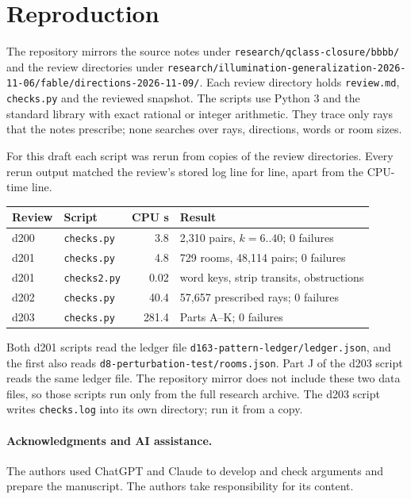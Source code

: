 \documentclass[11pt]{article}
\theoremstyle{definition}
\theoremstyle{remark}
\newcommand{\repopath}[1]{\nolinkurl{#1}}
\begin{document}
\section{Reproduction}\label{sec:repro}
The repository mirrors the source notes under
\repopath{research/qclass-closure/bbbb/} and the review directories under
\repopath{research/illumination-generalization-2026-11-06/fable/directions-2026-11-09/}.
Each review directory holds \texttt{review.md}, \texttt{checks.py} and the
reviewed snapshot. The scripts use Python 3 and the standard library with exact
rational or integer arithmetic. They trace only rays that the notes prescribe;
none searches over rays, directions, words or room sizes.

For this draft each script was rerun from copies of the review directories.
Every rerun output matched the review's stored log line for line, apart from the
CPU-time line.

\begin{center}
\begin{tabular}{llrl}
\toprule
Review & Script & CPU s & Result\\
\midrule
d200 & \texttt{checks.py} & 3.8 & 2{,}310 pairs, $k=6..40$; 0 failures\\
d201 & \texttt{checks.py} & 4.8 & 729 rooms, 48{,}114 pairs; 0 failures\\
d201 & \texttt{checks2.py} & 0.02 & word keys, strip transits, obstructions\\
d202 & \texttt{checks.py} & 40.4 & 57{,}657 prescribed rays; 0 failures\\
d203 & \texttt{checks.py} & 281.4 & Parts A--K; 0 failures\\
\bottomrule
\end{tabular}
\end{center}

Both d201 scripts read the ledger file
\repopath{d163-pattern-ledger/ledger.json}, and the first also reads
\repopath{d8-perturbation-test/rooms.json}. Part J of the d203 script reads the
same ledger file. The repository mirror does not include these two data files,
so those scripts run only from the full research archive. The d203 script writes
\texttt{checks.log} into its own directory; run it from a copy.

\paragraph{Acknowledgments and AI assistance.}
The authors used ChatGPT and Claude to develop and check arguments and
prepare the manuscript. The authors take responsibility for its content.
\end{document}
